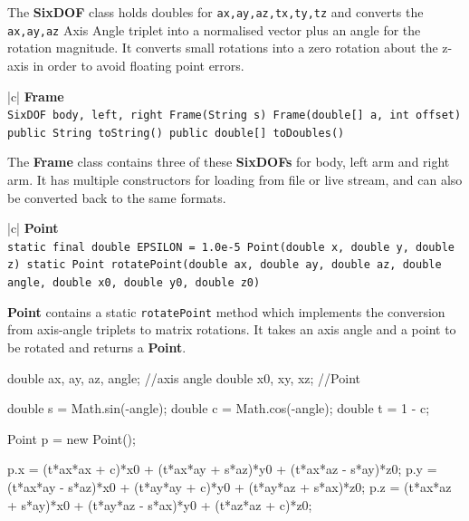 \documentclass[12pt,a4,notitlepage]{report}
\renewcommand{\_}{\texttt{\symbol{95}}}
\newcommand{\<}{\texttt{\symbol{60}}}
\renewcommand{\>}{\texttt{\symbol{62}}}
\newcommand{\class}[1]{\textbf{#1}}
\newcommand{\variable}[1]{\texttt{#1}}
\begin{document}
The \class{SixDOF} class holds doubles for \variable{ax,ay,az,tx,ty,tz} and converts the \variable{ax,ay,az} Axis Angle triplet into a normalised vector plus an angle for the rotation magnitude. It converts small rotations into a zero rotation about the z-axis in order to avoid floating point errors.

\begin{tabular}{|c|} \hline 
\class{Frame} \\ \hline
{}
{\variable{SixDOF body, left, right \newline
  Frame(String s) \newline
  Frame(double[] a, int offset) \newline
  public String toString() \newline
  public double[] toDoubles()
} } \\ \hline
\end{tabular}

The \class{Frame} class contains three of these \class{SixDOFs} for body, left arm and right arm. It has multiple constructors for loading from file or live stream, and can also be converted back to the same formats.

\begin{tabular}{|c|} \hline 
\class{Point} \\ \hline
{}
{\variable{static final double EPSILON = 1.0e-5 \newline
  Point(double x, double y, double z)\newline
  static Point rotatePoint(double ax, double ay, double az, double angle, double x0, double y0, double z0)
} } \\ \hline
\end{tabular}

\class{Point} contains a static \variable{rotatePoint} method which implements the conversion from axis-angle triplets to matrix rotations. It takes an axis angle and a point to be rotated and returns a \class{Point}.

\begin{code}
double ax, ay, az, angle; //axis angle
double x0, xy, xz; //Point

double s = Math.sin(-angle);
double c = Math.cos(-angle);
double t = 1 - c;

Point p = new Point();

p.x = (t*ax*ax + c)*x0 + (t*ax*ay + s*az)*y0 + (t*ax*az - s*ay)*z0;
p.y = (t*ax*ay - s*az)*x0 + (t*ay*ay + c)*y0 + (t*ay*az + s*ax)*z0;
p.z = (t*ax*az + s*ay)*x0 + (t*ay*az - s*ax)*y0 + (t*az*az + c)*z0;
\end{code}
\end{document}
